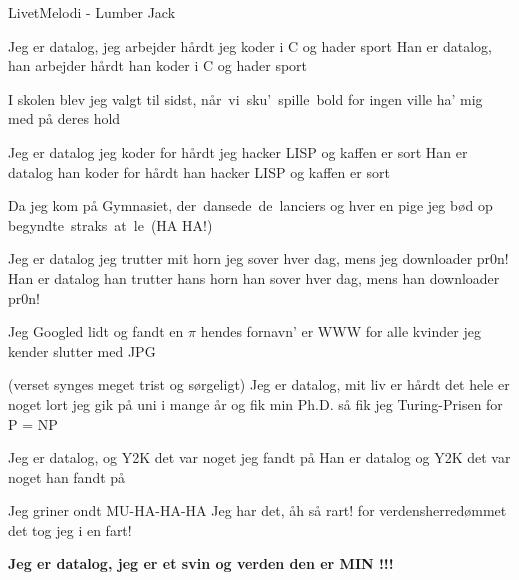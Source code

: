 \begin{sang}{Livet}{Melodi - Lumber Jack}
\begin{vers}
Jeg er datalog, jeg arbejder hårdt
jeg koder i C og hader sport
Han er datalog, han arbejder hårdt
han koder i C og hader sport
\end{vers}
\begin{vers}
I skolen blev jeg valgt til sidst, når~vi~sku'~spille~bold
for ingen ville ha' mig med på deres hold
\end{vers}
\begin{vers}
Jeg er datalog jeg koder for hårdt
jeg hacker LISP og kaffen er sort
Han er datalog han koder for hårdt
han hacker LISP og kaffen er sort
\end{vers}
\begin{vers}
Da jeg kom på Gymnasiet, der~dansede~de~lanciers
og hver en pige jeg bød op begyndte~straks~at~le~(HA HA!)
\end{vers}
\begin{vers}
Jeg er datalog jeg trutter mit horn
jeg sover hver dag, 
mens jeg downloader pr0n!
Han er datalog han trutter hans horn
han sover hver dag, 
mens han downloader pr0n!
\end{vers}
\vbox{}\vfill
\begin{vers}
Jeg Googled lidt og fandt en $\pi$ hendes fornavn' er WWW
for alle kvinder jeg kender slutter med JPG
\end{vers}
\begin{vers}
(verset synges meget trist og sørgeligt)
Jeg er datalog, mit liv er hårdt
det hele er noget lort
jeg gik på uni i mange år
og fik min Ph.D.
så fik jeg Turing-Prisen
for P = NP
\end{vers}
\begin{vers}
Jeg er datalog, og Y2K
det var noget jeg fandt på
Han er datalog og Y2K
det var noget han fandt på
\end{vers}
\begin{vers}
Jeg griner ondt
MU-HA-HA-HA
Jeg har det, åh så rart!
for verdensherredømmet
det tog jeg i en fart!
\end{vers}
\begin{vers}
{\bf Jeg er datalog, jeg er et svin
og verden den er MIN !!! }
\end{vers}
\laps
\end{sang}